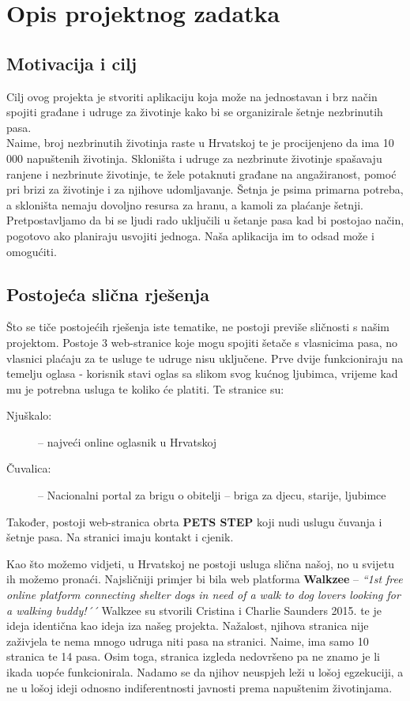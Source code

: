 \chapter{Opis projektnog zadatka}
		
		\section{Motivacija i cilj}
		Cilj ovog projekta je stvoriti aplikaciju koja može na jednostavan i brz način spojiti građane i udruge za životinje kako bi se organizirale šetnje nezbrinutih pasa.\\
		Naime, broj nezbrinutih životinja raste u Hrvatskoj te je procijenjeno da ima 10 000 napuštenih životinja. Skloništa i udruge za nezbrinute životinje spašavaju ranjene i
		nezbrinute životinje, te žele potaknuti građane na angažiranost, pomoć pri brizi za
		životinje i za njihove udomljavanje. Šetnja je psima primarna potreba, a skloništa nemaju dovoljno resursa za hranu, a kamoli za plaćanje šetnji. Pretpostavljamo da bi se ljudi rado uključili u šetanje pasa kad bi postojao način, pogotovo ako planiraju usvojiti jednoga. Naša aplikacija im to odsad može i omogućiti.\\
		
		\section{Postojeća slična rješenja}
		Što se tiče postojećih rješenja iste tematike, ne postoji previše sličnosti s našim projektom. Postoje 3 web-stranice koje mogu spojiti šetače s vlasnicima pasa, no vlasnici plaćaju za te usluge te udruge nisu uključene. Prve dvije funkcioniraju na temelju oglasa - korisnik stavi oglas sa slikom svog kućnog ljubimca, vrijeme kad mu je potrebna usluga te koliko će platiti. Te stranice su:
		\begin{description}
		\item [Njuškalo:] -- najveći online oglasnik u Hrvatskoj  
		\item [Čuvalica:] -- Nacionalni portal za brigu o obitelji -- briga za djecu, starije, ljubimce 
		\end{description}
		
		Također, postoji web-stranica obrta \textbf{PETS STEP} koji nudi uslugu čuvanja i šetnje pasa. Na stranici imaju kontakt i cjenik.\par
		Kao što možemo vidjeti, u Hrvatskoj ne postoji usluga slična našoj, no u svijetu ih možemo pronaći. Najsličniji primjer bi bila web platforma \textbf{Walkzee} -- \textit{``1st free online platform connecting shelter dogs in need of a walk to dog lovers looking for a walking buddy!´´} Walkzee su stvorili Cristina i Charlie Saunders 2015. te je ideja identična kao ideja iza našeg projekta. Nažalost, njihova stranica nije zaživjela te nema mnogo udruga niti pasa na stranici. Naime, ima samo 10 stranica te 14 pasa. Osim toga, stranica izgleda nedovršeno pa ne znamo je li ikada uopće funkcionirala. Nadamo se da njihov neuspjeh leži u lošoj egzekuciji, a ne u lošoj ideji odnosno indiferentnosti javnosti prema napuštenim životinjama. 
		
